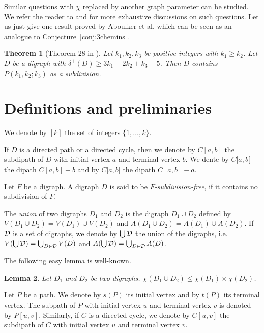 \documentclass[utf8,10pt]{article}
\theoremstyle{plain}
\newtheorem{theorem}{Theorem}
\newtheorem{lemma}[theorem]{Lemma}
\theoremstyle{definition}
\theoremstyle{remark}
\begin{document}
\medskip

Similar questions with $\chi$ replaced by another graph parameter can be studied.
We refer the reader to \cite{AC+16} and \cite{CHLN16} for more exhaustive discussions on such questions.
Let us just give one result proved by Aboulker et al. \cite{AC+16} which can be seen as an analogue to Conjecture~\ref{conj:3chemins}.

\begin{theorem}[Theorem 28 in \cite{AC+16}]
Let $k_1,k_2,k_3$ be  positive integers with $k_1 \ge k_2$.
Let $D$ be a digraph with $\delta^+(D) \geq 3k_1+2k_2+k_3-5$. Then $D$ contains $P(k_1,k_2;k_3)$ as a subdivision.
\end{theorem}


\section{Definitions and preliminaries}


We denote by $[k]$ the set of integers $\{1, \dots , k\}$.

If $D$ is a directed path or a directed cycle, then we denote by $C[a,b]$ the subdipath of $D$ with initial vertex $a$ and terminal vertex $b$.
We dente by $C[a,b[$ the dipath $C[a,b] -b$ and by $C]a,b]$ the dipath $C[a,b] -a$.

\medskip


Let $F$ be a digraph.
A digraph $D$ is said to be {\it $F$-subdivision-free}, if it contains no subdivision of $F$.

The {\it union} of two digraphs $D_1$ and $D_2$ is the digraph  $D_1\cup D_2$ defined by $V(D_1\cup D_2) = V(D_1)\cup V(D_2)$ and 
$A(D_1\cup D_2) = A(D_1)\cup A(D_2)$.
If ${\cal D}$ is a set of digraphs, we denote by $\bigcup {\cal D}$ the union of the digraphs, i.e. $V(\bigcup {\cal D}) =\bigcup_{D\in {\cal D}} V(D)$
and $A(\bigcup {\cal D}) =\bigcup_{D\in {\cal D}} A(D)$.


The following easy lemma is well-known.

\begin{lemma}\label{lem:decomp}
Let $D_1$ and $D_2$ be two digraphs.
$\chi(D_1\cup D_2) \leq \chi(D_1)\times \chi(D_2)$.
\end{lemma}




Let $P$ be a path. We denote by $s(P)$ its initial vertex and by $t(P)$ its terminal vertex.
The subpath of $P$ with initial vertex $u$ and terminal vertex $v$ is denoted by $P[u,v]$.
Similarly, if $C$ is a directed cycle, we denote by $C[u,v]$ the subdipath of $C$ with initial vertex $u$ and terminal vertex $v$.
\end{document}
